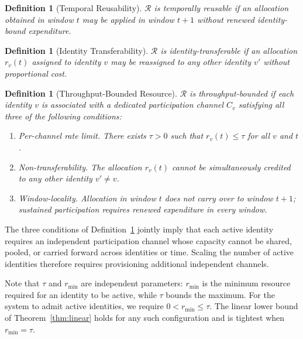 \documentclass[10pt,journal,compsoc]{IEEEtran}
\newtheorem{definition}[theorem]{Definition}
\theoremstyle{remark}
\begin{document}
	\begin{definition}[Temporal Reusability]
		\label{def:reusability}
		$\mathcal{R}$ is \emph{temporally reusable} if an
		allocation obtained in window $t$ may be applied in
		window $t+1$ without renewed identity-bound expenditure.
	\end{definition}
	
	\begin{definition}[Identity Transferability]
		\label{def:transferability}
		$\mathcal{R}$ is \emph{identity-transferable} if an
		allocation $r_v(t)$ assigned to identity $v$ may be
		reassigned to any other identity $v'$ without
		proportional cost.
	\end{definition}
	
	\begin{definition}[Throughput-Bounded Resource]
		\label{def:throughput}
		$\mathcal{R}$ is \emph{throughput-bounded} if each
		identity $v$ is associated with a dedicated participation
		channel $C_v$ satisfying all three of the following
		conditions:
		\begin{enumerate}
			\item \emph{Per-channel rate limit.}
			There exists $\tau > 0$ such that
			$r_v(t) \leq \tau$ for all $v$ and $t$.
			\item \emph{Non-transferability.}
			The allocation $r_v(t)$ cannot be simultaneously
			credited to any other identity $v' \neq v$.
			\item \emph{Window-locality.}
			Allocation in window $t$ does not carry over
			to window $t+1$; sustained participation
			requires renewed expenditure in every window.
		\end{enumerate}
	\end{definition}
	
	The three conditions of Definition~\ref{def:throughput}
	jointly imply that each active identity requires an
	independent participation channel whose capacity cannot
	be shared, pooled, or carried forward across identities
	or time.
	Scaling the number of active identities therefore
	requires provisioning additional independent channels.
	
	Note that $\tau$ and $r_{\min}$ are independent
	parameters: $r_{\min}$ is the minimum resource required
	for an identity to be active, while $\tau$ bounds
	the maximum.
	For the system to admit active identities, we require
	$0 < r_{\min} \leq \tau$.
	The linear lower bound of Theorem~\ref{thm:linear}
	holds for any such configuration and is tightest
	when $r_{\min} = \tau$.
	
\end{document}
